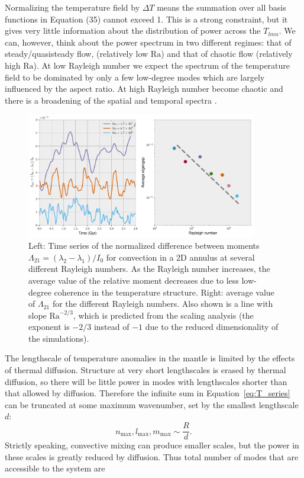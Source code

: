\documentclass[preprint,12pt,authoryear]{elsarticle}
\begin{document}
Normalizing the 
 temperature field by $\Delta T$ means the summation over all basis functions in Equation (35) cannot exceed 1. This is a strong constraint, but it gives very little information about the distribution of power across the $T_{lmn}$.  
We can, however, think about the power spectrum in two different regimes: that of steady/quasisteady flow, (relatively low $\mathrm{Ra}$) 
and that of chaotic flow (relatively high $\mathrm{Ra}$). At low Rayleigh number we expect the spectrum of the temperature field to be dominated by only a few low-degree modes which are largely influenced by the aspect ratio. At high Rayleigh number become chaotic and there is a broadening of the spatial and temporal spectra  \citep{mclaughlin1982transition}.  

\begin{figure}
\centering
\includegraphics[width=0.9\textwidth]{figures/eigengap.pdf}
\caption{ Left: Time series of the normalized difference between moments $\Lambda_{21} = (\lambda_2 - \lambda_1)/I_0$ for convection in a 2D annulus at several different Rayleigh numbers.  As the Rayleigh number increases, the average value of the relative moment decreases due to less low-degree coherence in the temperature structure.  Right:  average value of $\Lambda_{21}$ for the different Rayleigh numbers.  Also shown is a line with slope $\mathrm{Ra}^{-2/3}$, which is predicted from the scaling analysis (the exponent is $-2/3$ instead of $-1$ due to the reduced dimensionality of the simulations).}
\label{fig:eigengap}
\end{figure}

The lengthscale of temperature anomalies in the mantle is limited by the effects of thermal diffusion. 
Structure at very short lengthscales is erased by thermal diffusion, so there will be little power in modes
with lengthscales shorter than that allowed by diffusion. 
Therefore the infinite sum in Equation~\eqref{eq:T_series} can be truncated at some maximum wavenumber, set by the smallest lengthscale $d$:
\begin{equation}
n_{\text{max}}, l_{\text{max}}, m_{\text{max}} \sim \frac{R}{d}.
\label{eq:max_wavenumber}
\end{equation}
Strictly speaking, convective mixing can produce smaller scales, but the power in these scales
is greatly reduced by diffusion.
Thus total number of modes that are accessible to the system are 
\end{document}
